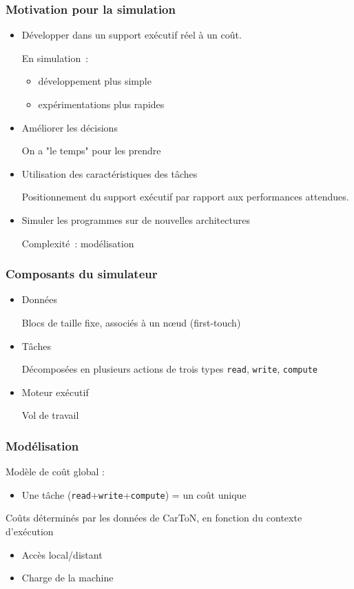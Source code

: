 \documentclass[xcolor={usenames,dvipsnames,svgnames,table}, aspectratio=43]{beamer}
\renewcommand{\emph}[1]{{\usebeamercolor[fg]{titlelike}#1}}
\begin{document}
\begin{frame}[fragile]
  \frametitle{Motivation pour la simulation}

  \begin{itemize}
    \item Développer dans un support exécutif réel à un coût.

      En simulation~:
      \begin{itemize}
	\item développement plus simple
	\item expérimentations plus rapides
      \end{itemize}

    \item Améliorer les décisions

      On a "le temps" pour les prendre

    \item Utilisation des caractéristiques des tâches

      Positionnement du support exécutif par rapport aux performances attendues.

    \item Simuler les programmes sur de nouvelles architectures

      Complexité~: modélisation
  \end{itemize}


\end{frame}

\begin{frame}[fragile]
  \frametitle{Composants du simulateur}
  \begin{itemize}
    \item Données

      Blocs de taille fixe, associés à un nœud (\emph{first-touch})

    \item Tâches

      Décomposées en plusieurs actions de trois types \verb/read/, \verb/write/, \verb/compute/

    \item Moteur exécutif

      Vol de travail
  \end{itemize}

\end{frame}

\begin{frame}[fragile]
  \frametitle{Modélisation}

  Modèle de coût global :

  \begin{itemize}
    \item Une tâche (\verb/read/+\verb/write/+\verb/compute/) = un coût unique
  \end{itemize}

  Coûts déterminés par les données de CarToN, en fonction du contexte d'exécution
  \begin{itemize}
    \item Accès local/distant
    \item Charge de la machine
  \end{itemize}

\end{frame}
\end{document}
